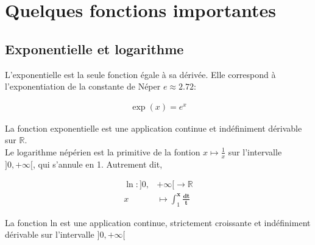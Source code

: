 \chapter{Quelques fonctions importantes}

\section{Exponentielle et logarithme}

L'exponentielle est la seule fonction égale à sa dérivée. Elle correspond à l'exponentiation de la constante de Néper $e \approx 2.72$:

\begin{align}
    \exp(x) = e^x
\end{align}

La fonction exponentielle est une application continue et indéfiniment dérivable sur $\mathbb{R}$.\\


Le logarithme népérien est la primitive de la fontion $x \mapsto \frac{1}{x}$ sur l'intervalle $] 0,+\infty[$, qui s'annule en 1. Autrement dit,

\begin{align}
\ln :] 0, & +\infty[\rightarrow \mathbb{R} \\
x & \mapsto \int_1^{\mathbf{x}} \frac{\mathbf{d t}}{\mathbf{t}}
\end{align}

La fonction ln est une application continue, strictement croissante et indéfiniment dérivable sur l'intervalle $] 0,+\infty[$



